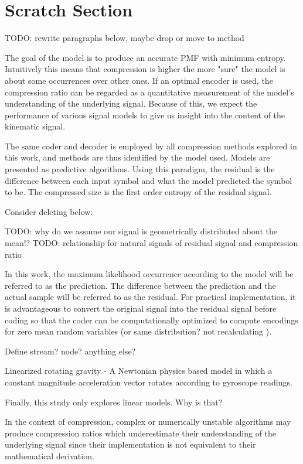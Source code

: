 \documentclass[journal]{IEEEtran}
\begin{document}
{}


\clearpage
\section*{Scratch Section}
TODO: rewrite paragraphs below, maybe drop or move to method

The goal of the model is to produce an accurate PMF with minimum entropy. Intuitively this means that compression is higher the more "sure" the model is about some occurrences over other ones. If an optimal encoder is used, the compression ratio can be regarded as a quantitative measurement of the model's understanding of the underlying signal. Because of this, we expect the performance of various signal models to give us insight into the content of the kinematic signal.

The same coder and decoder is employed by all compression methods explored in this work, and methods are thus identified by the model used. Models are presented as predictive algorithms. Using this paradigm, the residual is the difference between each input symbol and what the model predicted the symbol to be. The compressed size is the first order entropy of the residual signal.


Consider deleting below:

TODO: why do we assume our signal is geometrically distributed about the mean!?
TODO: relationship for natural signals of residual signal and compression ratio

In this work, the maximum likelihood occurrence according to the model will be referred to as the prediction. The difference between the prediction and the actual sample will be referred to as the residual. For practical implementation, it is advantageous to convert the original signal into the residual signal before coding so that the coder can be computationally optimized to compute encodings for zero mean random variables (or same distribution? not recalculating ).

Define stream? node? anything else?

Linearized rotating gravity - A Newtonian physics based model in which a constant magnitude acceleration vector rotates according to gyroscope readings.

Finally, this study only explores linear models. Why is that?

 In the context of compression, complex or numerically unstable algorithms may produce compression ratios which underestimate their understanding of the underlying signal since their implementation is not equivalent to their mathematical derivation.
\end{document}

